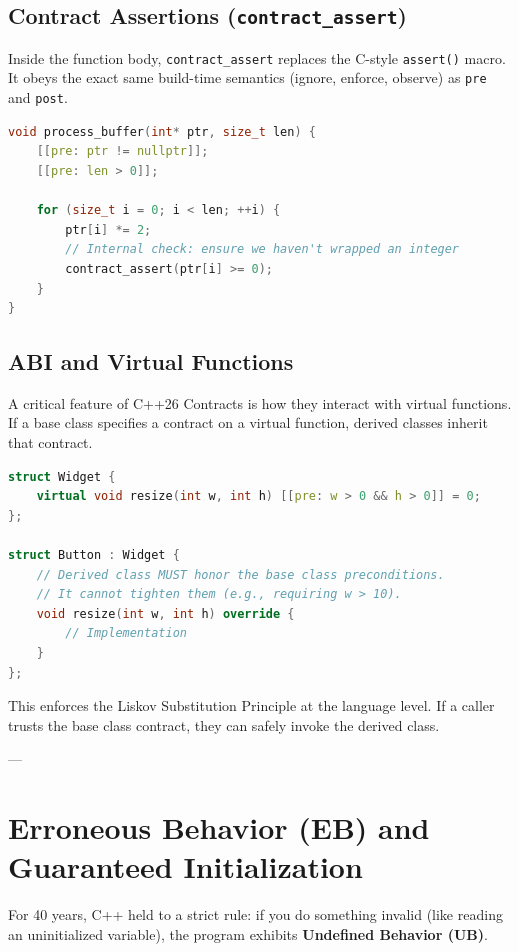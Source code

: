 {{{{{{\subsection{Contract Assertions (\texttt{contract_assert})}

Inside the function body, \texttt{contract_assert} replaces the C-style \texttt{assert()} macro. It obeys the exact same build-time semantics (ignore, enforce, observe) as \texttt{pre} and \texttt{post}.

\begin{lstlisting}[language=C++]
void process_buffer(int* ptr, size_t len) {
    [[pre: ptr != nullptr]];
    [[pre: len > 0]];
    
    for (size_t i = 0; i < len; ++i) {
        ptr[i] *= 2;
        // Internal check: ensure we haven't wrapped an integer
        contract_assert(ptr[i] >= 0); 
    }
}
\end{lstlisting}

\subsection{ABI and Virtual Functions}

A critical feature of C++26 Contracts is how they interact with virtual functions. If a base class specifies a contract on a virtual function, derived classes inherit that contract. 

\begin{lstlisting}[language=C++]
struct Widget {
    virtual void resize(int w, int h) [[pre: w > 0 && h > 0]] = 0;
};

struct Button : Widget {
    // Derived class MUST honor the base class preconditions.
    // It cannot tighten them (e.g., requiring w > 10).
    void resize(int w, int h) override {
        // Implementation
    }
};
\end{lstlisting}

This enforces the Liskov Substitution Principle at the language level. If a caller trusts the base class contract, they can safely invoke the derived class.

---

\section{Erroneous Behavior (EB) and Guaranteed Initialization}

For 40 years, C++ held to a strict rule: if you do something invalid (like reading an uninitialized variable), the program exhibits \textbf{Undefined Behavior (UB)}. 

}}}}}}
